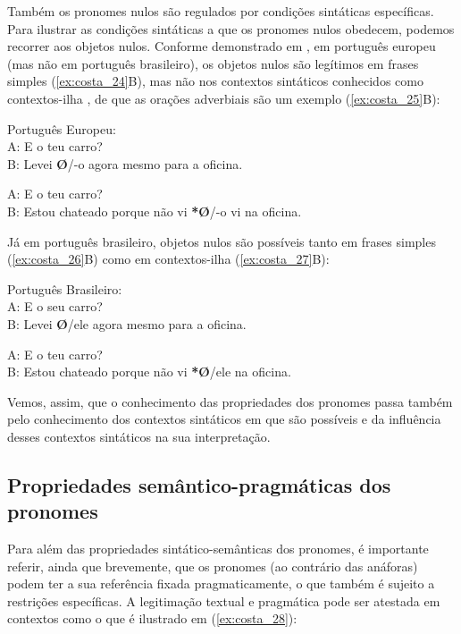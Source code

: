 \documentclass[output=paper]{LSP/langsci}
\begin{document}
Também os pronomes nulos são regulados por condições sintáticas específicas. Para ilustrar as condições sintáticas a que os pronomes nulos obedecem, podemos recorrer aos objetos nulos. Conforme demonstrado em \citet{raposo1986}, em português europeu (mas não em português brasileiro), os objetos nulos são legítimos em frases simples (\ref{ex:costa_24}B), mas não nos contextos sintáticos conhecidos como contextos-ilha \citep{ross1969}, de que as orações adverbiais são um exemplo (\ref{ex:costa_25}B):

\ea\label{ex:costa_24}
Português Europeu:\\
A: E o teu carro?\\
B: Levei \textbf{Ø}/-o agora mesmo para a oficina.
\z

\ea\label{ex:costa_25}
A: E o teu carro?\\
B: Estou chateado porque não vi \textbf{*Ø}/-o vi na oficina.
\z

Já em português brasileiro, objetos nulos são possíveis tanto em frases simples (\ref{ex:costa_26}B) como em contextos-ilha (\ref{ex:costa_27}B):

\ea\label{ex:costa_26}
Português Brasileiro:\\
A: E o seu carro?\\
B: Levei \textbf{Ø}/ele agora mesmo para a oficina.
\z

\ea\label{ex:costa_27}
A: E o teu carro?\\
B: Estou chateado porque não vi \textbf{*Ø}/ele na oficina.
\z

Vemos, assim, que o conhecimento das propriedades dos pronomes passa também pelo conhecimento dos contextos sintáticos em que são possíveis e da influência desses contextos sintáticos na sua interpretação.

\subsection{Propriedades se\-mân\-ti\-co-prag\-má\-ti\-cas dos pronomes}
\label{subsec:costa_propriedades_sem_prag_pronomes}

Para além das propriedades sintático-semânticas dos pronomes, é importante referir, ainda que brevemente, que os pronomes (ao contrário das anáforas) podem ter a sua referência fixada pragmaticamente, o que também é sujeito a restrições específicas. A legitimação textual e pragmática pode ser atestada em contextos como o que é ilustrado em (\ref{ex:costa_28}):
\end{document}
